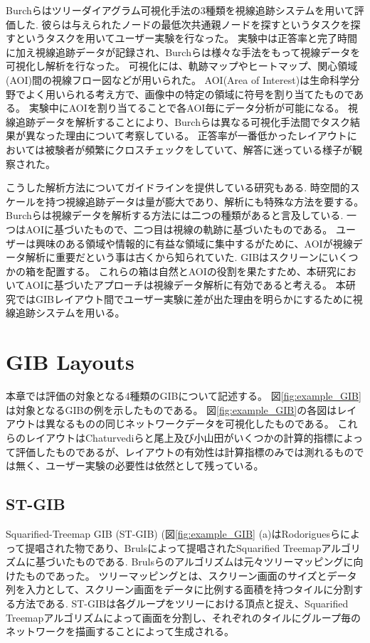 \documentclass{kuee}
\begin{document}
Burchらはツリーダイアグラム可視化手法の3種類を視線追跡システムを用いて評価した\cite{burch2011evaluation}.
彼らは与えられたノードの最低次共通親ノードを探すというタスクを探すというタスクを用いてユーザー実験を行なった。
実験中は正答率と完了時間に加え視線追跡データが記録され、Burchらは様々な手法をもって視線データを可視化し解析を行なった。
可視化には、軌跡マップやヒートマップ、関心領域(AOI)間の視線フロー図などが用いられた。
AOI(Area of Interest)は生命科学分野でよく用いられる考え方で、画像中の特定の領域に符号を割り当てたものである。
実験中にAOIを割り当てることで各AOI毎にデータ分析が可能になる。
視線追跡データを解析することにより、Burchらは異なる可視化手法間でタスク結果が異なった理由について考察している。
正答率が一番低かったレイアウトにおいては被験者が頻繁にクロスチェックをしていて、解答に迷っている様子が観察された。

こうした解析方法についてガイドラインを提供している研究もある\cite{andrienko2012visual,kurzhals2014evaluating,duchowski2007eye}.
時空間的スケールを持つ視線追跡データは量が膨大であり、解析にも特殊な方法を要する。
Burchらは視線データを解析する方法には二つの種類があると言及している\cite{Burch2013VisualTS}.
一つはAOIに基づいたもので、二つ目は視線の軌跡に基づいたものである。
ユーザーは興味のある領域や情報的に有益な領域に集中するがために、AOIが視線データ解析に重要だという事は古くから知られていた\cite{yarbus1967eye}.
GIBはスクリーンにいくつかの箱を配置する。
これらの箱は自然とAOIの役割を果たすため、本研究においてAOIに基づいたアプローチは視線データ解析に有効であると考える。
本研究ではGIBレイアウト間でユーザー実験に差が出た理由を明らかにするために視線追跡システムを用いる。

\chapter{GIB Layouts}
\label{chap:GIBs}

本章では評価の対象となる4種類のGIBについて記述する。
図\ref{fig:example_GIB}は対象となるGIBの例を示したものである。
図\ref{fig:example_GIB}の各図はレイアウトは異なるものの同じネットワークデータを可視化したものである。
これらのレイアウトはChaturvediら\cite{chaturvedi2014group}と尾上及び小山田\cite{onoue2017optimal}がいくつかの計算的指標によって評価したものであるが、レイアウトの有効性は計算指標のみでは測れるものでは無く、ユーザー実験の必要性は依然として残っている。

\section{ST-GIB}
Squarified-Treemap GIB (ST-GIB) (図\ref{fig:example_GIB} (a)はRodoriguesらによって提唱された物であり、Brulsによって提唱されたSquarified Treemapアルゴリズムに基づいたものである\cite{bruls2000squarified}.
Brulsらのアルゴリズムは元々ツリーマッピングに向けたものであった。
ツリーマッピングとは、スクリーン画面のサイズとデータ列を入力として、スクリーン画面をデータに比例する面積を持つタイルに分割する方法である\cite{shneiderman1992tree}.
ST-GIBは各グループをツリーにおける頂点と捉え、Squarified Treemapアルゴリズムによって画面を分割し、それぞれのタイルにグループ毎のネットワークを描画することによって生成される。
\end{document}
